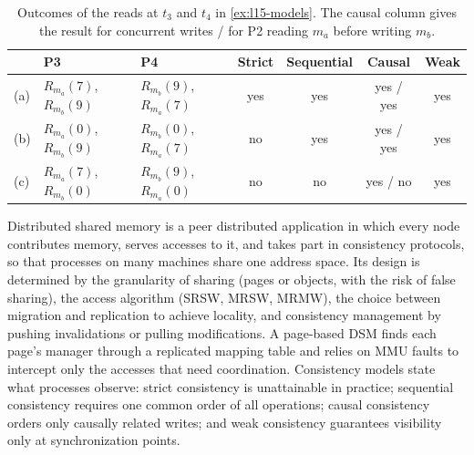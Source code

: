 \documentclass[../main.tex]{subfiles}
\begin{document}
\begin{table}[htbp]
  \centering
  \caption{Outcomes of the reads at $t_3$ and $t_4$ in \cref{ex:l15-models}.
    The causal column gives the result for concurrent writes / for P2
    reading $m_a$ before writing $m_b$.}
  \label{tab:l15-models}
  \small
  \begin{tabular}{@{}lllcccc@{}}
    \toprule
    & P3 & P4 & Strict & Sequential & Causal & Weak \\
    \midrule
    (a) & $R_{m_a}(7)$, $R_{m_b}(9)$ & $R_{m_b}(9)$, $R_{m_a}(7)$ & yes & yes
      & yes / yes & yes \\
    (b) & $R_{m_a}(0)$, $R_{m_b}(9)$ & $R_{m_b}(0)$, $R_{m_a}(7)$ & no & yes
      & yes / yes & yes \\
    (c) & $R_{m_a}(7)$, $R_{m_b}(0)$ & $R_{m_b}(9)$, $R_{m_a}(0)$ & no & no
      & yes / no & yes \\
    \bottomrule
  \end{tabular}
\end{table}

\begin{keypoint}
  Distributed shared memory is a peer distributed application in which every
  node contributes memory, serves accesses to it, and takes part in
  consistency protocols, so that processes on many machines share one
  address space.  Its design is determined by the granularity of sharing
  (pages or objects, with the risk of false sharing), the access algorithm
  (SRSW, MRSW, MRMW), the choice between migration and replication to
  achieve locality, and consistency management by pushing invalidations or
  pulling modifications.  A page-based DSM finds each page's manager through
  a replicated mapping table and relies on MMU faults to intercept only the
  accesses that need coordination.  Consistency models state what processes
  observe: strict consistency is unattainable in practice; sequential
  consistency requires one common order of all operations; causal
  consistency orders only causally related writes; and weak consistency
  guarantees visibility only at synchronization points.
\end{keypoint}
\end{document}
